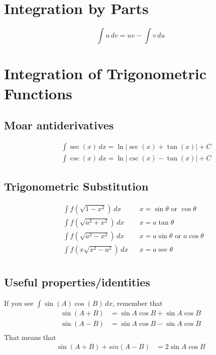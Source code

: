 \documentclass{article}
\begin{document}
\section{Integration by Parts}

\begin{equation*}
    \int u \, dv = uv - \int v \, du
\end{equation*}

\section{Integration of Trigonometric Functions}

\subsection*{Moar antiderivatives}
\begin{align*}
    &&\int \sec(x)\,dx = \ln|\sec(x)+\tan(x)| + C \\
    &&\int \csc(x)\,dx = \ln|\csc(x)-\tan(x)| + C
\end{align*}

\subsection*{Trigonometric Substitution}

\begin{align*}
   &\int f(\sqrt{1-x^2}) \,dx && x = \sin\theta \text{ or } \cos\theta \\
   &\int f(\sqrt{a^2+x^2}) \,dx && x = a\tan\theta \\
   &\int f(\sqrt{a^2-x^2}) \,dx && x = a\sin\theta \text{ or } a\cos\theta \\
   &\int f(x\sqrt{x^2-a^2}) \,dx && x = a\sec\theta \\
\end{align*}

\subsection*{Useful properties/identities}
If you see $\int \sin(A)\cos(B) \, dx$, remember that
\begin{align*}
    \sin(A+B) &= \sin A\cos B + \sin A\cos B \\
    \sin(A-B) &= \sin A\cos B - \sin A\cos B \\
\end{align*}
That means that
\begin{align*}
    \sin(A+B) + sin(A-B) &= 2\sin A\cos B\\
\end{align*}
\end{document}

